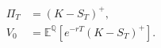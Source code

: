 \documentclass{equation-sheet}
\begin{document}
\begin{equation*}
\begin{aligned}
\Pi_T &= (K-S_T)^{+}, \\[0.75em]
V_0 &= \mathbb{E}^{\mathbb{Q}}\!\left[
  e^{-rT}(K-S_T)^{+}
\right].
\end{aligned}
\end{equation*}
\end{document}
